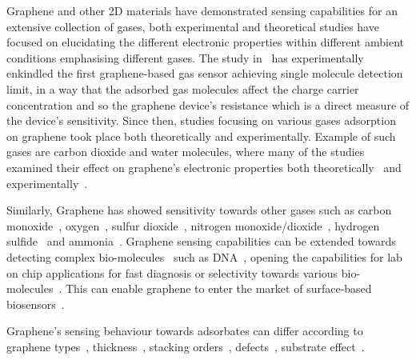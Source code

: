 Graphene and other 2D materials have demonstrated sensing capabilities for an extensive collection of gases, both experimental and theoretical studies have focused on elucidating the different electronic properties within different ambient conditions emphasising different gases. The study in~\cite{Schedin2007} has experimentally enkindled the first graphene-based gas sensor achieving single molecule detection limit, in a way that the adsorbed gas molecules affect the charge carrier concentration and so the graphene device's resistance which is a direct measure of the device's sensitivity. Since then, studies focusing on various gases adsorption on graphene took place both theoretically and experimentally. Example of such gases are carbon dioxide and water molecules, where many of the studies examined their effect on graphene's electronic properties both theoretically~\cite{Ong2001, wehling2008doping, Wehling2008, Wehling2009, Ribeiro2008, Berashevich2009, Dai2009, Leenaerts2009, Yuan2010, Yang2011, Yoon2013, Freitas2011, Mishra2011, Voloshina2011, Deng2012, Paulla2013, Nemade2013a, Cazorla2013, Chen2014, Dutta2014, Xiao2014, Elgammal2017} and experimentally~\cite{Moser2008, Dan2009, Ghosh2009, Lu2009, Yavari2010, Yoon2011, Kalon2011, Yao2012, Yang2012, Tuan2013, Borini2013, Giusca2015, Tamilarasan2015, Smith2015, Hong2016, Smith2016a, Smith2016a, Melios2016, Panchal2016, Smith2017, Xuge2017, Melios2017}. 

Similarly, Graphene has showed sensitivity towards other gases such as carbon monoxide~\cite{Schedin2007, Ao2008, Zhang2009a}, oxygen~\cite{Yang2011, Yuan2013}, sulfur dioxide~\cite{Chen2014}, nitrogen monoxide/dioxide~\cite{Zhang2009dopants, Leenaerts2009, Dai2012, Panchal2016}, hydrogen sulfide~\cite{Yuan2010, Sharma2013} and ammonia~\cite{Zhang2009dopants, Leenaerts2009, Dai2009, Yuan2010}. Graphene sensing capabilities can be extended towards detecting complex bio-molecules~\cite{Lerner2017} such as DNA~\cite{He2010, Shao2010}, opening the capabilities for lab on chip applications for fast diagnosis or selectivity towards various bio-molecules~\cite{Barik2017}. This can enable graphene to enter the market of surface-based biosensors~\cite{Shao2010}. 

Graphene's sensing behaviour towards adsorbates can differ according to graphene types~\cite{Smith2015}, thickness~\cite{Rafiee2012, Munz2015}, stacking orders~\cite{Melios2016}, defects~\cite{Banhart2011}, substrate effect~\cite{Hong2016, Wehling2008, Ashraf2016}. 
%
%
